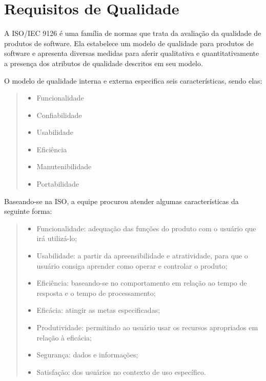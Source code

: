 \section[Requisitos de Qualidade]{Requisitos de Qualidade}
A ISO/IEC 9126 é uma família de normas que trata da avaliação da qualidade de
produtos de software. Ela estabelece um modelo de qualidade para produtos de software e
apresenta diversas medidas para aferir qualitativa e quantitativamente a presença dos atributos
de qualidade descritos em seu modelo. 

O modelo de qualidade interna e externa especifica seis características, sendo elas:
\begin{quote} 
	\begin{itemize}
        \item Funcionalidade
		\item Confiabilidade
		\item Usabilidade
		\item Eficiência
		\item Manutenibilidade
		\item Portabilidade
    \end{itemize}
\end{quote}

Baseando-se na ISO, a equipe procurou atender algumas características da seguinte forma:
\begin{quote} 
	\begin{itemize}
        \item Funcionalidade: adequação das funções do produto com o usuário que irá utilizá-lo;
        \item Usabilidade: a partir da apreensibilidade e atratividade, para que o usuário consiga aprender como operar e controlar o produto;
        \item Eficiência: baseando-se no comportamento em relação ao tempo de resposta e o tempo de processamento;
        \item Eficácia: atingir as metas especificadas;
        \item Produtividade: permitindo ao usuário usar os recursos apropriados em relação à eficácia;
        \item Segurança: dados e informações;
        \item Satisfação: dos usuários no contexto de uso específico.
    \end{itemize}
\end{quote}
